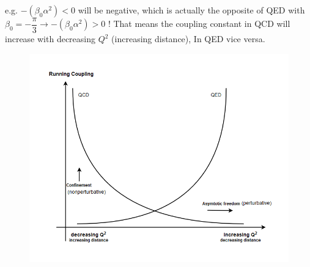 e.g. $ -(\beta_0 \alpha^2) <0 $ will be negative, which is actually the opposite of QED with $ \beta_0=- \dfrac{\pi}{3} \rightarrow -(\beta_0 \alpha^2) >0 $ ! That means the coupling constant in QCD will increase
with decreasing $ Q^2 $ (increasing distance), In QED vice versa.
\begin{figure}[h!]
\centering
\includegraphics[scale=0.7]{images/Intro/QCDRunningCoupling.png}
\end{figure}



